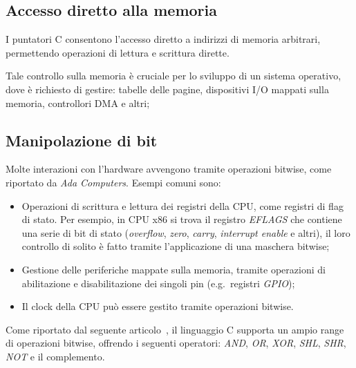 \subsection*{Accesso diretto alla memoria}
I puntatori C consentono l'accesso diretto a
indirizzi di memoria arbitrari, permettendo operazioni di lettura e 
scrittura dirette. 

Tale controllo sulla memoria è cruciale per lo sviluppo di un 
sistema operativo, dove è richiesto di gestire: tabelle delle pagine, dispositivi I/O mappati sulla memoria, controllori DMA e altri;

\subsection*{Manipolazione di bit}
Molte interazioni con l'hardware avvengono tramite operazioni bitwise, come riportato da \textit{Ada Computers}\cite{bitwise-operations}. 
Esempi comuni sono:
\begin{itemize}
    \item Operazioni di scrittura e lettura dei registri della CPU, come registri di flag di stato. Per esempio, in CPU x86 si trova il registro \textit{EFLAGS} che contiene una serie di bit di stato (\textit{overflow}, \textit{zero}, \textit{carry}, \textit{interrupt enable} e altri), il loro controllo di solito è fatto tramite l'applicazione di una maschera bitwise;
    \item Gestione delle periferiche mappate sulla memoria, tramite operazioni di abilitazione e disabilitazione dei singoli pin (e.g.\  registri \textit{GPIO});
    \item Il clock della CPU può essere gestito tramite operazioni bitwise.
\end{itemize}
Come riportato dal seguente articolo~\cite{bitwise-operations-c}, il linguaggio C supporta un ampio range di operazioni bitwise, offrendo i seguenti operatori: \textit{AND}, \textit{OR}, \textit{XOR}, \textit{SHL}, \textit{SHR}, \textit{NOT} e il complemento.

